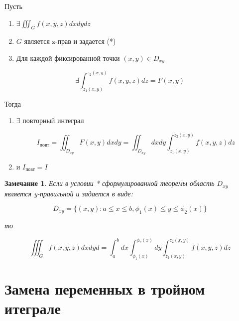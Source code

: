 \documentclass[a4paper, 14pt]{report}
\newtheorem{note}{Замечание}[chapter]
\begin{document}
    \begin{theorem}
        Пусть

        \begin{enumerate}
            \item $\exists \iiint_G f(x,y,z) dxdydz$
            \item $G$ является z-прав и задается (*)
            \item Для каждой фиксированной точки $(x,y) \in D_{xy}$
        \end{enumerate}

        $$
        \exists \int_{z_1(x,y)}^{z_2(x,y)} f(x,y,z) dz = F(x,y)
        $$

        Тогда 

        \begin{enumerate}
            \item $\exists$ повторный интеграл

                $$
                I_\text{повт} = \iint_{D_{xy}} F(x,y) dxdy = \iint_{D_{xy}} dxdy \int_{z_1(x,y)}^{z_2(x,y)} f(x,y,z) dz
                $$

            \item и $I_\text{повт} = I$
        \end{enumerate}
    \end{theorem}

    \begin{note}
        Если в условии * сформулированной теоремы область $D_{xy}$ является y-правильной и задается в виде:

        $$
        D_{xy} = \{ (x,y): a \le x \le b, \phi_1(x) \le y \le \phi_2(x) \}
        $$

        то

        $$
        \iiint_G f(x,y,z) dxdyd = \int_a^bdx \int_{\phi_1(x)}^{\phi_2(x)} dy \int_{z_1(x,y)}^{z_2(x,y)} f(x,y,z) dz
        $$
    \end{note}

    \section{Замена переменных в тройном итеграле}
\end{document}
